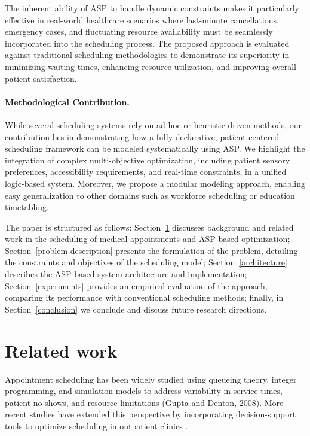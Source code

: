 \documentclass{tlp}
\begin{document}
The inherent ability of ASP to handle dynamic constraints makes it particularly effective in real-world healthcare scenarios where last-minute cancellations, emergency cases, and fluctuating resource availability must be seamlessly incorporated into the scheduling process. The proposed approach is evaluated against traditional scheduling methodologies to demonstrate its superiority in minimizing waiting times, enhancing resource utilization, and improving overall patient satisfaction.

\paragraph{Methodological Contribution.}
While several scheduling systems rely on ad hoc or heuristic-driven methods, our contribution lies in demonstrating how a fully declarative, patient-centered scheduling framework can be modeled systematically using ASP. We highlight the integration of complex multi-objective optimization, including patient sensory preferences, accessibility requirements, and real-time constraints, in a unified logic-based system. Moreover, we propose a modular modeling approach, enabling easy generalization to other domains such as workforce scheduling or education timetabling.

The paper is structured as follows: Section~\ref{related} discusses background and related work in the scheduling of medical appointments and ASP-based optimization; Section~\ref{problem-description} presents the formulation of the problem, detailing the constraints and objectives of the scheduling model; Section~\ref{architecture} describes the ASP-based system architecture and implementation; Section~\ref{experiments} provides an empirical evaluation of the approach, comparing its performance with conventional scheduling methods; finally, in Section~\ref{conclusion} we conclude and discuss future research directions.

\section{Related work}
\label{related}

Appointment scheduling has been widely studied using queueing theory, integer programming, and simulation models to address variability in service times, patient no-shows, and resource limitations (Gupta and Denton, 2008). More recent studies have extended this perspective by incorporating decision-support tools to optimize scheduling in outpatient clinics \citep{niu2023review}.
\end{document}
